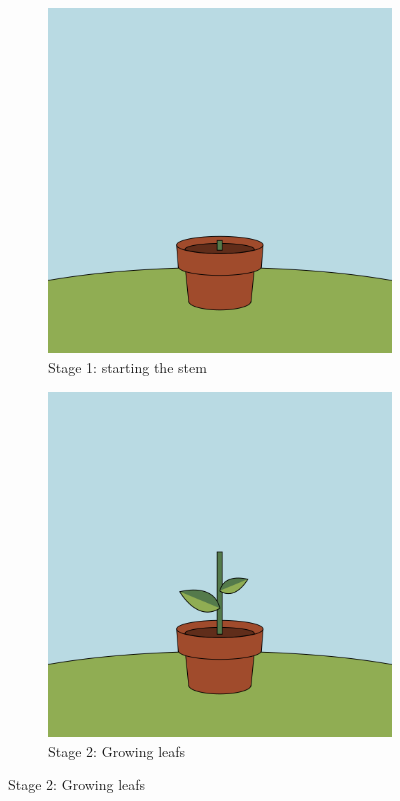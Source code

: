 \begin{figure}[H]
    \centering
    \begin{subfigure}[t]{.4\textwidth}
        \centering

        \includegraphics[width=\linewidth]{Figures/day_2/stage_1.png}
        \caption{Stage 1: starting the stem}
        \label{fig: animation stage 1}

    \end{subfigure}
    \hspace{1cm}
    \begin{subfigure}[t]{.4\textwidth}
        \centering

        \includegraphics[width=\linewidth]{Figures/day_2/stage_2.png}
        \caption{Stage 2: Growing leafs}
        \label{fig: animation stage 2}


\end{subfigure}
\end{figure}
